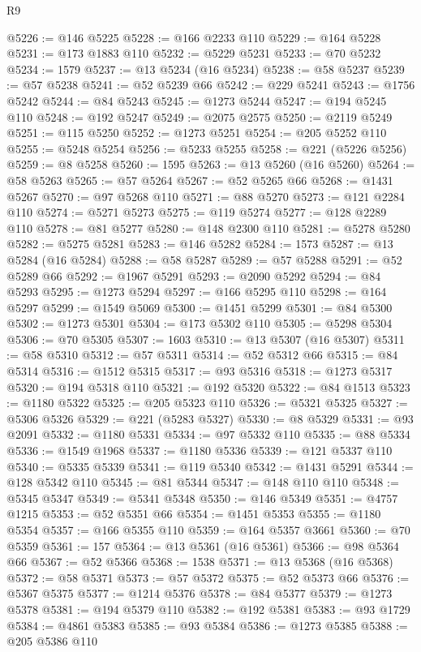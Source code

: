 \begin{lexlean}{R9}
\begin{coremodule}
@5226 := @146 @5225
@5228 := @166 @2233 @110
@5229 := @164 @5228
@5231 := @173 @1883 @110
@5232 := @5229 @5231
@5233 := @70 @5232
@5234 := 1579
@5237 := @13 @5234 (@16 @5234)
@5238 := @58 @5237
@5239 := @57 @5238
@5241 := @52 @5239 @66
@5242 := @229 @5241
@5243 := @1756 @5242
@5244 := @84 @5243
@5245 := @1273 @5244
@5247 := @194 @5245 @110
@5248 := @192 @5247
@5249 := @2075 @2575
@5250 := @2119 @5249
@5251 := @115 @5250
@5252 := @1273 @5251
@5254 := @205 @5252 @110
@5255 := @5248 @5254
@5256 := @5233 @5255
@5258 := @221 (@5226 @5256)
@5259 := @8 @5258
@5260 := 1595
@5263 := @13 @5260 (@16 @5260)
@5264 := @58 @5263
@5265 := @57 @5264
@5267 := @52 @5265 @66
@5268 := @1431 @5267
@5270 := @97 @5268 @110
@5271 := @88 @5270
@5273 := @121 @2284 @110
@5274 := @5271 @5273
@5275 := @119 @5274
@5277 := @128 @2289 @110
@5278 := @81 @5277
@5280 := @148 @2300 @110
@5281 := @5278 @5280
@5282 := @5275 @5281
@5283 := @146 @5282
@5284 := 1573
@5287 := @13 @5284 (@16 @5284)
@5288 := @58 @5287
@5289 := @57 @5288
@5291 := @52 @5289 @66
@5292 := @1967 @5291
@5293 := @2090 @5292
@5294 := @84 @5293
@5295 := @1273 @5294
@5297 := @166 @5295 @110
@5298 := @164 @5297
@5299 := @1549 @5069
@5300 := @1451 @5299
@5301 := @84 @5300
@5302 := @1273 @5301
@5304 := @173 @5302 @110
@5305 := @5298 @5304
@5306 := @70 @5305
@5307 := 1603
@5310 := @13 @5307 (@16 @5307)
@5311 := @58 @5310
@5312 := @57 @5311
@5314 := @52 @5312 @66
@5315 := @84 @5314
@5316 := @1512 @5315
@5317 := @93 @5316
@5318 := @1273 @5317
@5320 := @194 @5318 @110
@5321 := @192 @5320
@5322 := @84 @1513
@5323 := @1180 @5322
@5325 := @205 @5323 @110
@5326 := @5321 @5325
@5327 := @5306 @5326
@5329 := @221 (@5283 @5327)
@5330 := @8 @5329
@5331 := @93 @2091
@5332 := @1180 @5331
@5334 := @97 @5332 @110
@5335 := @88 @5334
@5336 := @1549 @1968
@5337 := @1180 @5336
@5339 := @121 @5337 @110
@5340 := @5335 @5339
@5341 := @119 @5340
@5342 := @1431 @5291
@5344 := @128 @5342 @110
@5345 := @81 @5344
@5347 := @148 @110 @110
@5348 := @5345 @5347
@5349 := @5341 @5348
@5350 := @146 @5349
@5351 := @4757 @1215
@5353 := @52 @5351 @66
@5354 := @1451 @5353
@5355 := @1180 @5354
@5357 := @166 @5355 @110
@5359 := @164 @5357 @3661
@5360 := @70 @5359
@5361 := 157
@5364 := @13 @5361 (@16 @5361)
@5366 := @98 @5364 @66
@5367 := @52 @5366
@5368 := 1538
@5371 := @13 @5368 (@16 @5368)
@5372 := @58 @5371
@5373 := @57 @5372
@5375 := @52 @5373 @66
@5376 := @5367 @5375
@5377 := @1214 @5376
@5378 := @84 @5377
@5379 := @1273 @5378
@5381 := @194 @5379 @110
@5382 := @192 @5381
@5383 := @93 @1729
@5384 := @4861 @5383
@5385 := @93 @5384
@5386 := @1273 @5385
@5388 := @205 @5386 @110

\end{coremodule}
\end{lexlean}
